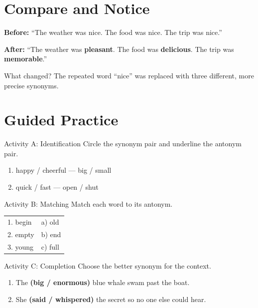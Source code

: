 \section{Compare and Notice}
\textbf{Before:} ``The weather was nice. The food was nice. The trip was nice.''

\textbf{After:} ``The weather was \textbf{pleasant}. The food was \textbf{delicious}. The trip was \textbf{memorable}.''

What changed? The repeated word ``nice'' was replaced with three different, more precise synonyms.

\section{Guided Practice}
\begin{activitybox}{Activity A: Identification}
Circle the synonym pair and underline the antonym pair.
\begin{enumerate}
    \item happy / cheerful --- big / small
    \item quick / fast --- open / shut
\end{enumerate}
\end{activitybox}

\begin{activitybox}{Activity B: Matching}
Match each word to its antonym.

\begin{tabular}{ll}
    1. begin & a) old \\
    2. empty & b) end \\
    3. young & c) full \\
\end{tabular}
\end{activitybox}

\begin{activitybox}{Activity C: Completion}
Choose the better synonym for the context.
\begin{enumerate}
    \item The \textbf{(big / enormous)} blue whale swam past the boat.
    \item She \textbf{(said / whispered)} the secret so no one else could hear.
\end{enumerate}
\end{activitybox}

